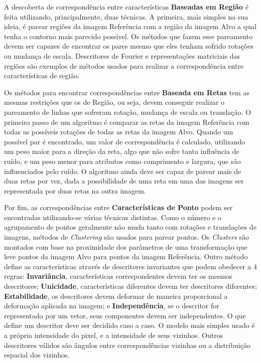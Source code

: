     A descoberta de correspondência entre características \textbf{Baseadas em Região} é feita utilizando, principalmente, duas 
técnicas. A primeira, mais simples na sua ideia, é parear regiões da imagem Referência com a região da imagem Alvo a 
qual tenha o contorno mais parecido possível. Os métodos que fazem esse pareamento devem ser capazes de encontrar os 
pares mesmo que eles tenham sofrido rotações ou mudança de escala. Descritores de Fourier e representações matriciais 
das regiões são exemplos de métodos usados para realizar a correspondência entre características de região.

    Os métodos para encontrar correspondências entre \textbf{Baseada em Retas} tem as mesmas restrições que os
de Região, ou seja, devem conseguir realizar o pareamento de linhas que sofreram rotação, mudança de escala ou 
translação. O primeiro passo de um algoritmo é comparar as retas da imagem Referência com todas as possíveis rotações 
de todas as retas da imagem Alvo. Quando um possível par é encontrado, um valor de correspondência é calculado, 
utilizando um peso maior para a direção da reta, algo que não sofre tanta influência de ruído, e um peso menor para 
atributos como comprimento e largura, que são influenciados pelo ruído. O algoritmo ainda deve ser capaz de parear mais 
de duas retas por vez, dada a possibilidade de uma reta em uma das imagens ser representada por duas retas na outra 
imagem.

    Por fim, as correspondências entre \textbf{Características de Ponto} podem ser encontradas utilizando-se várias 
técnicas distintas. Como o número e o agrupamento de pontos geralmente não muda tanto com rotações e translações de 
imagens, métodos de \textit{Clustering} são usados para parear pontos. Os \textit{Clusters} são montados com base na 
proximidade dos parâmetros de uma transformação que leve pontos da imagem Alvo para pontos da imagem Referência. Outro 
método define as características através de descritores invariantes que podem obedecer a 4 regras: \textbf{Invariância}, 
características correspondentes devem ter os mesmos descritores; \textbf{Unicidade}, características diferentes devem 
ter descritores diferentes; \textbf{Estabilidade}, os descritores devem deformar de maneira proporcional a deformação
aplicada na imagem; e \textbf{Independência}, se o descritor for representado por um vetor, seus componentes devem ser 
independentes. O que define um descritor deve ser decidido caso a caso. O modelo mais simples usado é a própria 
intensidade do pixel, e a intensidade de seus vizinhos. Outros descritores válidos são ângulos entre correspondências 
vizinhas ou a distribuição espacial dos vizinhos.


